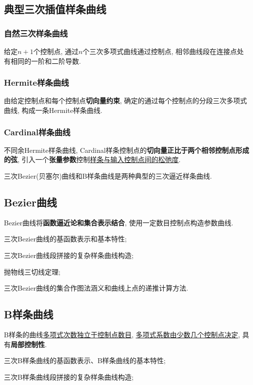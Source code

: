 \documentclass[12pt, a4paper, oneside]{ctexart}
\def\ul{\underline}         %
\def\bf{\textbf}            %
\begin{document}
\subsection{典型三次插值样条曲线}

\subsubsection{自然三次样条曲线}

给定$n+1$个控制点, 通过$n$个三次多项式曲线通过控制点, 相邻曲线段在连接点处有相同的一阶和二阶导数.

\subsubsection{Hermite样条曲线}

由给定控制点和每个控制点\bf{切向量约束}, 确定的通过每个控制点的分段三次多项式曲线, 构成一条Hermite样条曲线.

\subsubsection{Cardinal样条曲线}

不同余Hermite样条曲线, Cardinal样条控制点的\bf{切向量正比于两个相邻控制点形成的弦}, 引入一个\bf{张量参数}控制\ul{样条与输入控制点间的松弛度}.

三次Bezier(贝塞尔)曲线和B样条曲线是两种典型的三次逼近样条曲线.

\subsection{Bezier曲线}
Bezier曲线将\bf{函数逼近论和集合表示结合}, 使用一定数目控制点构造参数曲线.

三次Bezier曲线的基函数表示和基本特性;

三次Bezier曲线段拼接的复杂样条曲线构造;

抛物线三切线定理;

三次Bezier曲线的集合作图法涵义和曲线上点的递推计算方法.

\subsection{B样条曲线}

B样条的曲线\ul{多项式次数独立于控制点数目}, \ul{多项式系数由少数几个控制点决定}, 具有\bf{局部控制性}.

三次B样条曲线的基函数表示、B样条曲线的基本特性;

三次B样条曲线段拼接的复杂样条曲线构造;
\end{document}
